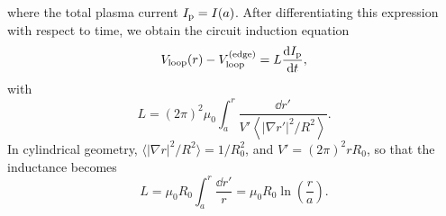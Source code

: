 \documentclass{notes}
\newcommand{\Ip}{I_{\rm p}}
\newcommand{\Vl}{V_{\rm loop}}
\newcommand{\Vle}{\Vl^{({\rm edge})}}
\begin{document}
    where the total plasma current $\Ip = I(a)$. After differentiating this
    expression with respect to time, we obtain the circuit induction equation
    \begin{equation}
        \Vl(r)-\Vle = L\frac{\dd\Ip}{\dd t},
    \end{equation}
    with
    \begin{equation}
        L = \left(2\pi\right)^2\mu_0\int_a^r\frac{\dd r'}
        {V'\left\langle\left|\nabla r'\right|^2/R^2\right\rangle}.
    \end{equation}
    In cylindrical geometry, $\langle|\nabla r|^2/R^2\rangle = 1/R_0^2$, and
    $V' = \left(2\pi\right)^2rR_0$, so that the inductance becomes
    \begin{equation}
        L = \mu_0R_0\int_a^r\frac{\dd r'}{r} = \mu_0 R_0 \ln\left(\frac{r}{a}\right).
    \end{equation}
\end{document}
